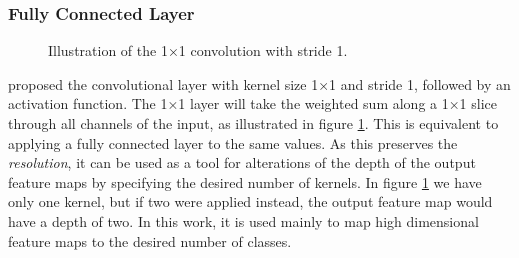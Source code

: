 \subsubsection{Fully Connected Layer}
    \begin{figure}[H]
        \centering
        
        \caption[1×1 convolution]{Illustration of the 1×1 convolution with stride 1.}
      	\medskip 
        \label{1x1_fig}
    \end{figure}
    \citeauthor{lin2013network_in_network_1x1}\cite{lin2013network_in_network_1x1} proposed the convolutional layer with kernel size 1×1 and stride 1, followed by an activation function. The 1×1 layer will take the weighted sum along a 1×1 slice through all channels of the input, as illustrated in figure \ref{1x1_fig}. This is equivalent to applying a fully connected layer to the same values. As this preserves the \textit{resolution}, it can be used as a tool for alterations of the depth of the output feature maps by specifying the desired number of kernels. In figure \ref{1x1_fig} we have only one kernel, but if two were applied instead, the output feature map would have a depth of two. In this work, it is used mainly to map high dimensional feature maps to the desired number of classes.
    
    

